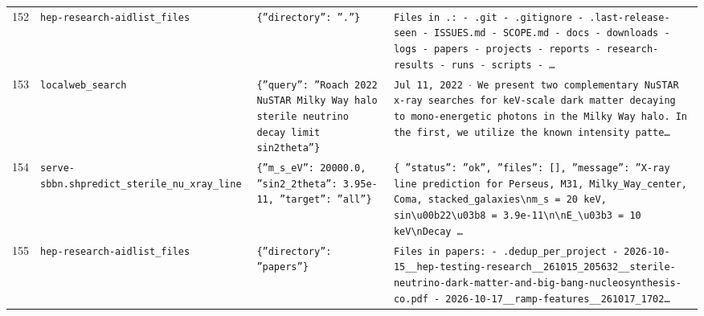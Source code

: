 \documentclass[11pt,a4paper]{article}
\begin{document}
\begin{longtable}{@{}p{}p{}p{}p{}@{}}
152 & \texttt{hep-research-aid}\newline\texttt{list\_\allowbreak{}files} & \texttt{\{''directory'':\allowbreak{} ''.''\}\allowbreak{}} & \texttt{Files in .:\allowbreak{}   - .git   - .gitignore   - .last-release-seen   - ISSUES.md   - SCOPE.md   - docs   - downloads   - logs   - papers   - projects   - reports   - research-results   - runs   - scripts   - \ldots{}\allowbreak{}} \\
153 & \texttt{local}\newline\texttt{web\_\allowbreak{}search} & \texttt{\{''query'':\allowbreak{} ''Roach 2022 NuSTAR Milky Way halo sterile neutrino decay limit sin2theta''\}\allowbreak{}} & \texttt{Jul 11,\allowbreak{} 2022 $\cdot$ We present two complementary NuSTAR x-ray searches for keV-scale dark matter decaying to mono-energetic photons in the Milky Way halo. In the first,\allowbreak{} we utilize the known intensity patte\ldots{}\allowbreak{}} \\
154 & \texttt{serve-sbbn.sh}\newline\texttt{predict\_\allowbreak{}sterile\_\allowbreak{}nu\_\allowbreak{}xray\_\allowbreak{}line} & \texttt{\{''m\_\allowbreak{}s\_\allowbreak{}eV'':\allowbreak{} 20000.0,\allowbreak{} ''sin2\_\allowbreak{}2theta'':\allowbreak{} 3.95e-11,\allowbreak{} ''target'':\allowbreak{} ''all''\}\allowbreak{}} & \texttt{\{   ''status'':\allowbreak{} ''ok'',\allowbreak{}   ''files'':\allowbreak{} []\allowbreak{},\allowbreak{}   ''message'':\allowbreak{} ''X-ray line prediction for Perseus,\allowbreak{} M31,\allowbreak{} Milky\_\allowbreak{}Way\_\allowbreak{}center,\allowbreak{} Coma,\allowbreak{} stacked\_\allowbreak{}galaxies\textbackslash{}\allowbreak{}nm\_\allowbreak{}s =\allowbreak{} 20 keV,\allowbreak{} sin\textbackslash{}\allowbreak{}u00b22\textbackslash{}\allowbreak{}u03b8 =\allowbreak{} 3.9e-11\textbackslash{}\allowbreak{}n\textbackslash{}\allowbreak{}nE\_\allowbreak{}\textbackslash{}\allowbreak{}u03b3 =\allowbreak{} 10 keV\textbackslash{}\allowbreak{}nDecay \ldots{}\allowbreak{}} \\
155 & \texttt{hep-research-aid}\newline\texttt{list\_\allowbreak{}files} & \texttt{\{''directory'':\allowbreak{} ''papers''\}\allowbreak{}} & \texttt{Files in papers:\allowbreak{}   - .dedup\_\allowbreak{}per\_\allowbreak{}project   - 2026-10-15\_\allowbreak{}\_\allowbreak{}hep-testing-research\_\allowbreak{}\_\allowbreak{}261015\_\allowbreak{}205632\_\allowbreak{}\_\allowbreak{}sterile-neutrino-dark-matter-and-big-bang-nucleosynthesis-co.pdf   - 2026-10-17\_\allowbreak{}\_\allowbreak{}ramp-features\_\allowbreak{}\_\allowbreak{}261017\_\allowbreak{}1702\ldots{}\allowbreak{}} \\

\end{longtable}
\end{document}
